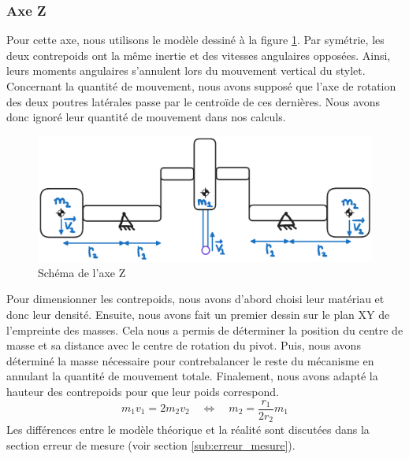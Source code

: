 \documentclass[a4paper, 11pt]{article} %
\begin{document}
\subsubsection*{Axe Z}
Pour cette axe, nous utilisons le modèle dessiné à la figure \ref{equ_z}. Par symétrie, les deux contrepoids ont la même inertie et des vitesses angulaires opposées. Ainsi, leurs moments angulaires s'annulent lors du mouvement vertical du stylet. Concernant la quantité de mouvement, nous avons supposé que l'axe de rotation des deux poutres latérales passe par le centroïde de ces dernières. Nous avons donc ignoré leur quantité de mouvement dans nos calculs.
\begin{figure}[H]
    \centering
    \includegraphics[width=0.5\linewidth]{images/equilibrageZ_schema.png}
    \caption{Schéma de l'axe Z}
    \label{equ_z}
\end{figure}
Pour dimensionner les contrepoids, nous avons d'abord choisi leur matériau et donc leur densité. Ensuite, nous avons fait un premier dessin sur le plan XY de l'empreinte des masses. Cela nous a permis de déterminer la position du centre de masse et sa distance avec le centre de rotation du pivot. Puis, nous avons déterminé la masse nécessaire pour contrebalancer le reste du mécanisme en annulant la quantité de mouvement totale. Finalement, nous avons adapté la hauteur des contrepoids pour que leur poids correspond.
$$
m_1v_1 = 2m_2v_2 \quad \Leftrightarrow \quad m_2 = \frac{r_1}{2r_2}m_1
$$
Les différences entre le modèle théorique et la réalité sont discutées dans la section erreur de mesure (voir section \ref{sub:erreur_mesure}).
\end{document}
